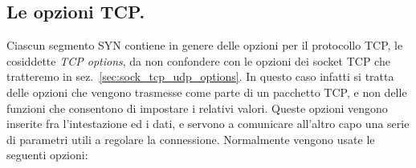 \subsection{Le opzioni TCP.}
\label{sec:TCP_TCP_opt}

Ciascun segmento SYN contiene in genere delle opzioni per il protocollo TCP,
le cosiddette \textit{TCP options}, da non confondere con le opzioni dei
socket TCP che tratteremo in sez.~\ref{sec:sock_tcp_udp_options}. In questo
caso infatti si tratta delle opzioni che vengono trasmesse come parte di un
pacchetto TCP, e non delle funzioni che consentono di impostare i relativi
valori. Queste opzioni vengono inserite fra l'intestazione ed i dati, e
servono a comunicare all'altro capo una serie di parametri utili a regolare la
connessione. Normalmente vengono usate le seguenti opzioni:

